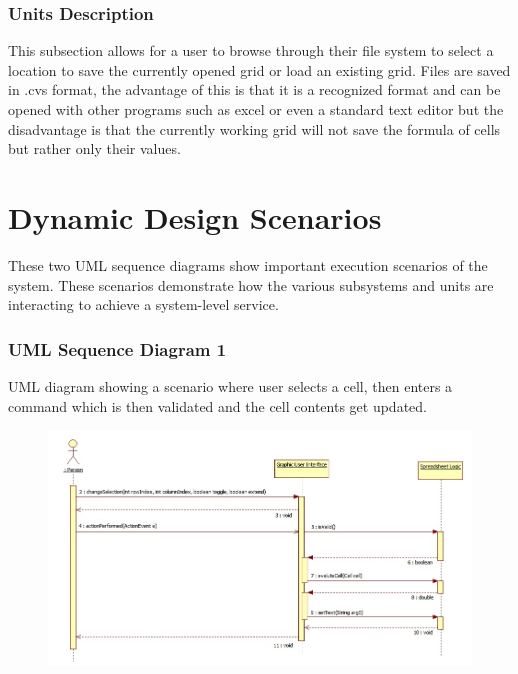 \documentclass[12pt]{article}
\begin{document}
\subsubsection{Units Description}
This subsection allows for a user to browse through their file system to select a location to save the currently opened grid or load an existing grid. Files are saved in .cvs format, the advantage of this is that it is a recognized format and can be opened with other programs such as excel or even a standard text editor but the disadvantage is that the currently working grid will not save the formula of cells but rather only their values. 

\clearpage

\section{Dynamic Design Scenarios}
These two UML sequence diagrams show important execution scenarios of the system. These scenarios demonstrate how the various subsystems and units are interacting to achieve a system-level service.

\subsubsection{UML Sequence Diagram 1}
UML diagram showing a scenario where user selects a cell, then enters a
command which is then validated and the cell contents get updated.
\begin{figure}[ht!]
\centering
\includegraphics[width=170mm]{SequenceDiagram1.jpg}
\end{figure}

\clearpage
\end{document}
